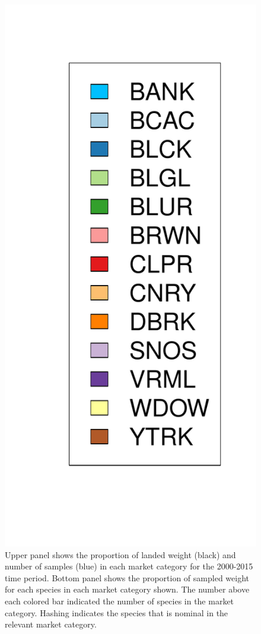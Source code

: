 \documentclass[12pt]{article}
\begin{document}
\begin{landscape}
\begin{figure}[h!]
\includegraphics[height=0.8\textheight]{./pictures/barplotLegend.pdf}
\caption{Upper panel shows the proportion of landed weight (black) and number of                 
samples (blue) in each market category for the 2000-2015 time period. Bottom panel 
shows the proportion of sampled weight for each species in each market category 
shown. The number above each colored bar indicated the number of species in 
the market category. Hashing indicates the species that is nominal in the 
relevant market category.}
\label{bar00}
\end{figure}
\end{landscape}
\end{document}
